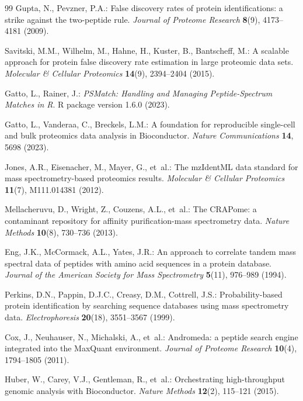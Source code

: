 \documentclass[11pt,twoside,openright]{book}
\begin{document}
\begin{thebibliography}{99}
Gupta, N., Pevzner, P.A.:
\newblock False discovery rates of protein identifications: a strike against the two-peptide rule.
\newblock \emph{Journal of Proteome Research} \textbf{8}(9), 4173--4181 (2009).
\newblock {}

Savitski, M.M., Wilhelm, M., Hahne, H., Kuster, B., Bantscheff, M.:
\newblock A scalable approach for protein false discovery rate estimation in large proteomic data sets.
\newblock \emph{Molecular \& Cellular Proteomics} \textbf{14}(9), 2394--2404 (2015).
\newblock {}

Gatto, L., Rainer, J.:
\newblock \emph{PSMatch: Handling and Managing Peptide-Spectrum Matches in R}.
\newblock R package version 1.6.0 (2023).
\newblock {}

Gatto, L., Vanderaa, C., Breckels, L.M.:
\newblock A foundation for reproducible single-cell and bulk proteomics data analysis in {Bioconductor}.
\newblock \emph{Nature Communications} \textbf{14}, 5698 (2023).
\newblock {}

Jones, A.R., Eisenacher, M., Mayer, G., et~al.:
\newblock The {mzIdentML} data standard for mass spectrometry-based proteomics results.
\newblock \emph{Molecular \& Cellular Proteomics} \textbf{11}(7), M111.014381 (2012).
\newblock {}

Mellacheruvu, D., Wright, Z., Couzens, A.L., et~al.:
\newblock The {CRAPome}: a contaminant repository for affinity purification-mass spectrometry data.
\newblock \emph{Nature Methods} \textbf{10}(8), 730--736 (2013).
\newblock {}

Eng, J.K., McCormack, A.L., Yates, J.R.:
\newblock An approach to correlate tandem mass spectral data of peptides with amino acid sequences in a protein database.
\newblock \emph{Journal of the American Society for Mass Spectrometry} \textbf{5}(11), 976--989 (1994).
\newblock {}

Perkins, D.N., Pappin, D.J.C., Creasy, D.M., Cottrell, J.S.:
\newblock Probability-based protein identification by searching sequence databases using mass spectrometry data.
\newblock \emph{Electrophoresis} \textbf{20}(18), 3551--3567 (1999).
\newblock {}

Cox, J., Neuhauser, N., Michalski, A., et~al.:
\newblock Andromeda: a peptide search engine integrated into the {MaxQuant} environment.
\newblock \emph{Journal of Proteome Research} \textbf{10}(4), 1794--1805 (2011).
\newblock {}

Huber, W., Carey, V.J., Gentleman, R., et~al.:
\newblock Orchestrating high-throughput genomic analysis with {Bioconductor}.
\newblock \emph{Nature Methods} \textbf{12}(2), 115--121 (2015).
\newblock {}

\end{thebibliography}
\end{document}
